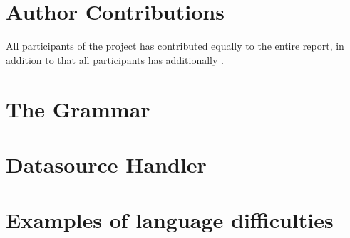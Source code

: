 \documentclass[10pt,a4paper,twocolumn]{article}
\begin{document}
\appendix
\section{Author Contributions}
All participants of the project has contributed equally to the entire report,
in addition to that all participants has additionally .

\section{The Grammar}


\section{Datasource Handler}


\section{Examples of language difficulties}

\end{document}

